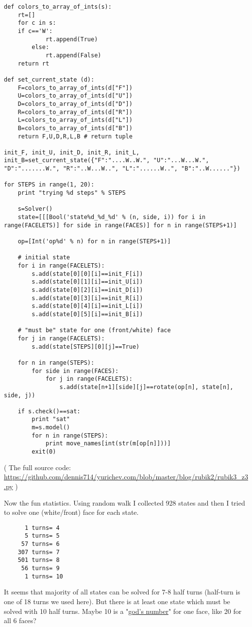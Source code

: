 \begin{lstlisting}
def colors_to_array_of_ints(s):
    rt=[]
    for c in s:
	if c=='W':
            rt.append(True)
        else:
            rt.append(False)
    return rt

def set_current_state (d):
    F=colors_to_array_of_ints(d["F"])
    U=colors_to_array_of_ints(d["U"])
    D=colors_to_array_of_ints(d["D"])
    R=colors_to_array_of_ints(d["R"])
    L=colors_to_array_of_ints(d["L"])
    B=colors_to_array_of_ints(d["B"])
    return F,U,D,R,L,B # return tuple

init_F, init_U, init_D, init_R, init_L, init_B=set_current_state({"F":"....W..W.", "U":"...W...W.", "D":".......W.", "R":"..W...W..", "L":"......W..", "B":"..W......"})

for STEPS in range(1, 20):
	print "trying %d steps" % STEPS

	s=Solver()
	state=[[[Bool('state%d_%d_%d' % (n, side, i)) for i in range(FACELETS)] for side in range(FACES)] for n in range(STEPS+1)]

	op=[Int('op%d' % n) for n in range(STEPS+1)]

	# initial state
	for i in range(FACELETS):
		s.add(state[0][0][i]==init_F[i])
		s.add(state[0][1][i]==init_U[i])
		s.add(state[0][2][i]==init_D[i])
		s.add(state[0][3][i]==init_R[i])
		s.add(state[0][4][i]==init_L[i])
		s.add(state[0][5][i]==init_B[i])

	# "must be" state for one (front/white) face
	for j in range(FACELETS):
		s.add(state[STEPS][0][j]==True)

	for n in range(STEPS):
		for side in range(FACES):
			for j in range(FACELETS):
				s.add(state[n+1][side][j]==rotate(op[n], state[n], side, j))

	if s.check()==sat:
		print "sat"
		m=s.model()
		for n in range(STEPS):
			print move_names[int(str(m[op[n]]))]
		exit(0)
\end{lstlisting}

( The full source code: \url{https://github.com/dennis714/yurichev.com/blob/master/blog/rubik2/rubik3_z3.py} )

Now the fun statistics.
Using random walk I collected 928 states and then I tried to solve one (white/front) face for each state.

\begin{lstlisting}
      1 turns= 4
      5 turns= 5
     57 turns= 6
    307 turns= 7
    501 turns= 8
     56 turns= 9
      1 turns= 10
\end{lstlisting}

It seems that majority of all states can be solved for 7-8 half turns (half-turn is one of 18 turns we used here).
But there is at least one state which must be solved with 10 half turns.
Maybe 10 is a "\href{http://www.cube20.org/}{god’s number}" for one face, like 20 for all 6 faces?

